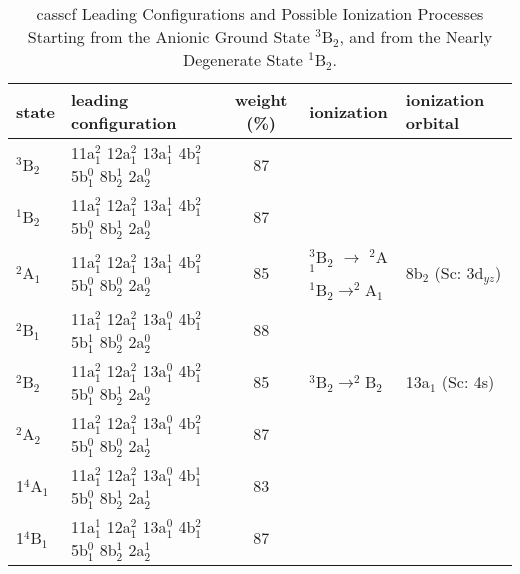 \begin{refsection}
\begin{table}[]
	\small
	\centering
	\caption{\acrshort{casscf} Leading Configurations and Possible Ionization Processes Starting from the Anionic Ground State $^3$B$_2$, and from the Nearly Degenerate State $^1$B$_2$.}
	\label{tbl3:leading}
	\begin{threeparttable}
	\begin{tabular}{@{}llcll@{}}
		\toprule
		state & leading configuration                   		        & weight (\%) & ionization  & ionization orbital  \\ \midrule
$^3$B$_2$ & 11a$_1^2$ 12a$_1^2$ 13a$_1^1$ 4b$_1^2$ 5b$_1^0$ 8b$_2^1$ 2a$_2^0$  & 87   &                                       &                      \\
$^1$B$_2$ & 11a$_1^2$ 12a$_1^2$ 13a$_1^1$ 4b$_1^2$ 5b$_1^0$ 8b$_2^1$ 2a$_2^0$  & 87   &                                       &                      \\
\multirow{2}{*}{$^2$A$_1$} & \multirow{2}{*}{11a$_1^2$ 12a$_1^2$ 13a$_1^1$ 4b$_1^2$ 5b$_1^0$ 8b$_2^0$ 2a$_2^0$} & \multirow{2}{*}{85} & $^3$B$_2$ $\longrightarrow$ $^2$A$_1$    & \multirow{2}{*}{8b$_2$ (Sc: 3d$_{yz}$)} \\
		      &                                         &                             & $^1$B$_2 \longrightarrow ^2$A$_1$\tnote{(b)} &              \\
$^2$B$_1$  & 11a$_1^2$ 12a$_1^2$ 13a$_1^0$ 4b$_1^2$ 5b$_1^1$ 8b$_2^0$ 2a$_2^0$  & 88  &                                      &                      \\
$^2$B$_2$  & 11a$_1^2$ 12a$_1^2$ 13a$_1^0$ 4b$_1^2$ 5b$_1^0$ 8b$_2^1$ 2a$_2^0$  & 85  & $^3$B$_2 \longrightarrow ^2$B$_2$    & 13a$_1$ (Sc: 4s)     \\
$^2$A$_2$  & 11a$_1^2$ 12a$_1^2$ 13a$_1^0$ 4b$_1^2$ 5b$_1^0$ 8b$_2^0$ 2a$_2^1$  & 87  &                                      &                      \\
1$^4$A$_1$ & 11a$_1^2$ 12a$_1^2$ 13a$_1^0$ 4b$_1^1$ 5b$_1^0$ 8b$_2^1$ 2a$_2^1$  & 83  &                                      &                      \\
1$^4$B$_1$ & 11a$_1^1$ 12a$_1^2$ 13a$_1^0$ 4b$_1^2$ 5b$_1^0$ 8b$_2^1$ 2a$_2^1$  & 87  &                                      &                      \\

\end{tabular}
\end{threeparttable}
\end{table}
\end{refsection}
